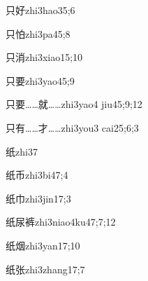 \begin{verbete}{只好}{zhi3hao3}{5;6}
\end{verbete}

\begin{verbete}{只怕}{zhi3pa4}{5;8}
\end{verbete}

\begin{verbete}{只消}{zhi3xiao1}{5;10}
\end{verbete}

\begin{verbete}{只要}{zhi3yao4}{5;9}
\end{verbete}

\begin{verbete}{只要……就……}{zhi3yao4 jiu4}{5;9;12}
\end{verbete}

\begin{verbete}{只有……才……}{zhi3you3 cai2}{5;6;3}
\end{verbete}

\begin{verbete}{纸}{zhi3}{7}
\end{verbete}

\begin{verbete}{纸币}{zhi3bi4}{7;4}
\end{verbete}

\begin{verbete}{纸巾}{zhi3jin1}{7;3}
\end{verbete}

\begin{verbete}{纸尿裤}{zhi3niao4ku4}{7;7;12}
\end{verbete}

\begin{verbete}{纸烟}{zhi3yan1}{7;10}
\end{verbete}

\begin{verbete}{纸张}{zhi3zhang1}{7;7}
\end{verbete}

